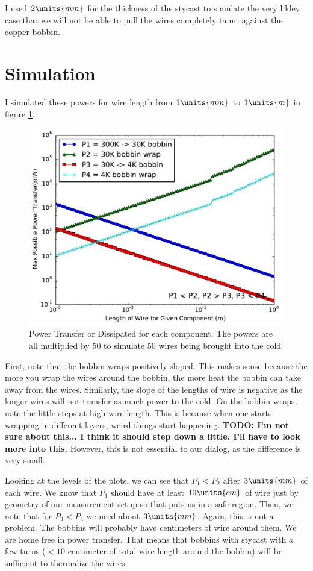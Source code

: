\documentclass[10pt,twocolumn,aps,rmp,tightenlines,reprint]{revtex4-1}
\begin{document}
I used \(2 \units{mm}\) for the thickness 
of the stycast to simulate the very likley case that we will not be able to
pull the wires completely taunt against the copper bobbin.

\section{Simulation}
I simulated these powers for wire length from \(1 \units{mm}\) to 
\(1 \units{m}\) in figure \ref{fig}.
\begin{figure}
\includegraphics[width=\columnwidth]{powertransver_vs_wirelen_forbobbins.pdf}
\caption{Power Transfer or Dissipated for each component.  The powers are all
multiplied by 50 to simulate 50 wires being brought into the cold}
\label{fig}
\end{figure}

First, note that the bobbin wraps positively sloped.  
This makes sense because the 
more you wrap the wires around the bobbin, the more heat the bobbin can take 
away from the wires.  Similarly, the slope of the lengths of wire is negative
as the longer wires will not transfer as much power to the cold.  On the 
bobbin wraps, note the little steps at high wire length.  This is because when
one starts wrapping in different layers, weird things start happening.  
\textbf{TODO: I'm
not sure about this... I think it should step down a little.  I'll have to look
more into this.}
However, this is not essential to our dialog, as the difference is very small.

Looking at the levels of the plots, we can see that \(P_1<P_2\) after 
\(3\units{mm}\) of each wire.  We know that \(P_1\) should have at least 
\(10 \units{cm}\) of wire just by geometry of our measurement setup so that 
puts us in a safe region.  Then, we note that for \(P_3 < P_4\) we need about 
\(3\units{mm}\).  Again, this is not a problem.  The bobbins will probably
have centimeters of wire around them.  We are home free in power transfer.  
That means that bobbins with stycast with a few turns (\(<10\) centimeter of 
total wire length around the bobbin) will be sufficient to thermalize the wires.
\end{document}
